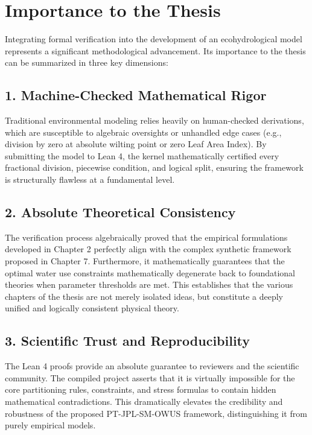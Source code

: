 \documentclass[11pt,a4paper]{article}
\begin{document}
\section{Importance to the Thesis}
Integrating formal verification into the development of an ecohydrological model represents a significant methodological advancement. Its importance to the thesis can be summarized in three key dimensions:

\subsection{1. Machine-Checked Mathematical Rigor}
Traditional environmental modeling relies heavily on human-checked derivations, which are susceptible to algebraic oversights or unhandled edge cases (e.g., division by zero at absolute wilting point or zero Leaf Area Index). By submitting the model to Lean 4, the kernel mathematically certified every fractional division, piecewise condition, and logical split, ensuring the framework is structurally flawless at a fundamental level.

\subsection{2. Absolute Theoretical Consistency}
The verification process algebraically proved that the empirical formulations developed in Chapter 2 perfectly align with the complex synthetic framework proposed in Chapter 7. Furthermore, it mathematically guarantees that the optimal water use constraints mathematically degenerate back to foundational theories when parameter thresholds are met. This establishes that the various chapters of the thesis are not merely isolated ideas, but constitute a deeply unified and logically consistent physical theory.

\subsection{3. Scientific Trust and Reproducibility}
The Lean 4 proofs provide an absolute guarantee to reviewers and the scientific community. The compiled project asserts that it is virtually impossible for the core partitioning rules, constraints, and stress formulas to contain hidden mathematical contradictions. This dramatically elevates the credibility and robustness of the proposed PT-JPL-SM-OWUS framework, distinguishing it from purely empirical models.
\end{document}
